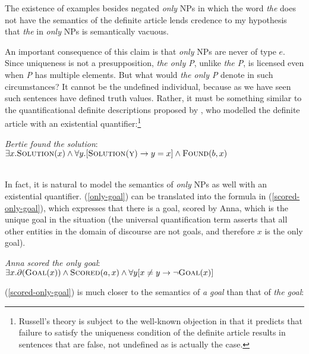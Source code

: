 The existence of examples besides negated \textit{only} NPs in which the word \textit{the} does not have the semantics of the definite article lends credence to my hypothesis that \textit{the} in \textit{only} NPs is semantically vacuous.

An important consequence of this claim is that \textit{only} NPs are never of type $e$. Since uniqueness is not a presupposition, \textit{the only P}, unlike \textit{the P}, is licensed even when \textit{P} has multiple elements. But what would \textit{the only P} denote in such circumstances? It cannot be the undefined individual, because as we have seen such sentences have defined truth values. Rather, it must be something similar to the quantificational definite descriptions proposed by \citet{russell}, who modelled the definite article with an existential quantifier:\footnote{Russell's theory is subject to the well-known objection in \citet{strawson50} that it predicts that failure to satisfy the uniqueness condition of the definite article results in sentences that are false, not undefined as is actually the case.}

\begin{exe}
	\ex \textit{Bertie found the solution}: \\
	$\exists x . \textsc{Solution}(x) \land \forall y . [\textsc{Solution(y)} \to y = x] \land \textsc{Found}(b, x)$ \\ \\
	\hspace*{\fill} \citep[ex. 1$'$]{horn-abbott-2012}  %
\end{exe}

In fact, it is natural to model the semantics of \textit{only} NPs as well with an existential quantifier. (\ref{only-goal}) can be translated into the formula in (\ref{scored-only-goal}), which expresses that there is a goal, scored by Anna, which is the unique goal in the situation (the universal quantification term asserts that all other entities in the domain of discourse are not goals, and therefore $x$ is the only goal).

\begin{exe}
	\ex \label{scored-only-goal} \textit{Anna scored the only goal}: \\ $\exists x . \partial(\textsc{Goal}(x)) \land \textsc{Scored}(a, x) \land \forall y [ x \ne y \to \neg \textsc{Goal}(x) ] $
\end{exe}

(\ref{scored-only-goal}) is much closer to the semantics of \textit{a goal} than that of \textit{the goal}:

